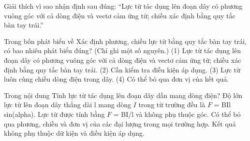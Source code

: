 \begin{bt}
Giải thích vì sao nhận định sau đúng: “Lực từ tác dụng lên đoạn dây có phương vuông góc với cả dòng điện và vectơ cảm ứng từ; chiều xác định bằng quy tắc bàn tay trái.”
\end{bt}

\begin{ex}
Trong bốn phát biểu về Xác định phương, chiều lực từ bằng quy tắc bàn tay trái, có bao nhiêu phát biểu đúng? (Chỉ ghi một số nguyên.) (1) Lực từ tác dụng lên đoạn dây có phương vuông góc với cả dòng điện và vectơ cảm ứng từ; chiều xác định bằng quy tắc bàn tay trái. (2) Cần kiểm tra điều kiện áp dụng. (3) Lực từ luôn cùng chiều dòng điện trong dây. (4) Có thể bỏ qua đơn vị của kết quả.
\end{ex}

\begin{ex}
Trong nội dung Tính lực từ tác dụng lên đoạn dây dẫn mang dòng điện?
\choice
{\True Độ lớn lực từ lên đoạn dây thẳng dài l mang dòng $I$ trong từ trường đều là $F$ = BIl sin(alpha).}
{Lực từ được tính bằng $F$ = BI/l và không phụ thuộc góc.}
{Có thể bỏ qua phương, chiều và đơn vị của các đại lượng trong mọi trường hợp.}
{Kết quả không phụ thuộc dữ kiện và điều kiện áp dụng.}
\end{ex}

